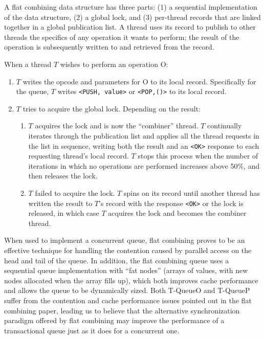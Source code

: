 A flat combining data structure has three parts: (1) a sequential implementation of the data structure, (2) a global lock, and (3) per-thread records that are linked together in a global publication list. A thread uses its record to publish to other threads the specifics of any operation it wants to perform; the result of the operation is subsequently written to and retrieved from the record.

When a thread $T$ wishes to perform an operation O:
\begin{enumerate}
    \item $T$ writes the opcode and parameters for O to its local record. Specifically for the queue, $T$ writes \texttt{<PUSH, value>} or \texttt{<POP,()>} to its local record.
   \item $T$ tries to acquire the global lock. Depending on the result:
   \begin{enumerate}
       \item $T$ acquires the lock and is now the “combiner” thread. $T$ continually iterates through the publication list and applies all the thread requests in the list in sequence, writing both the result and an \texttt{<OK>} response to each requesting thread's local record. $T$ stops this process when the number of iterations in which no operations are performed increases above 50\%, and then releases the lock.
        \item $T$ failed to acquire the lock. $T$ spins on its record until another thread has written the result to $T$'s record with the response \texttt{<OK>} or the lock is released, in which case $T$ acquires the lock and becomes the combiner thread. 
    \end{enumerate}
\end{enumerate}

When used to implement a concurrent queue, flat combining proves to be an effective technique for handling the contention caused by parallel access on the head and tail of the queue. In addition, the flat combining queue uses a sequential queue implementation with ``fat nodes'' (arrays of values, with new nodes allocated when the array fills up), which both improves cache performance and allows the queue to be dynamically sized. Both T-QueueO and T-QueueP suffer from the contention and cache performance issues pointed out in the flat combining paper, leading us to believe that the alternative synchronization paradigm offered by flat combining may improve the performance of a transactional queue just as it does for a concurrent one.

